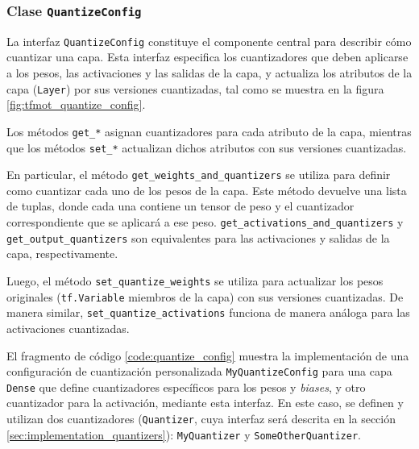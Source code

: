 
\subsubsection{Clase \texttt{QuantizeConfig}}
\label{sec:quantize_config}
La interfaz \texttt{QuantizeConfig} \cite{tensorflow_quantize_config} constituye el componente central para describir cómo cuantizar una capa. Esta interfaz especifica los cuantizadores que deben aplicarse a los pesos, las activaciones y las salidas de la capa, y actualiza los atributos de la capa (\texttt{Layer}) por sus versiones cuantizadas, tal como se muestra en la figura \ref{fig:tfmot_quantize_config}.


Los métodos \texttt{get\_*} asignan cuantizadores para cada atributo de la capa, mientras que los métodos \texttt{set\_*} actualizan dichos atributos con sus versiones cuantizadas.

En particular, el método \texttt{get\_weights\_and\_quantizers} se utiliza para definir como cuantizar cada uno de los pesos de la capa. Este método devuelve una lista de tuplas, donde cada una contiene un tensor de peso y el cuantizador correspondiente que se aplicará a ese peso. \texttt{get\_activations\_and\_quantizers} y \texttt{get\_output\_quantizers} son equivalentes para las activaciones y salidas de la capa, respectivamente.

Luego, el método \texttt{set\_quantize\_weights} se utiliza para actualizar los pesos originales (\texttt{tf.Variable} miembros de la capa) con sus versiones cuantizadas. De manera similar, \texttt{set\_quantize\_activations} funciona de manera análoga para las activaciones cuantizadas.

El fragmento de código \ref{code:quantize_config} muestra la implementación de una configuración de cuantización personalizada \texttt{MyQuantizeConfig} para una capa \texttt{Dense} que define cuantizadores específicos para los pesos y \textit{biases}, y otro cuantizador para la activación,  mediante esta interfaz. En este caso, se definen y utilizan dos cuantizadores (\texttt{Quantizer}, cuya interfaz será descrita en la sección \ref{sec:implementation_quantizers}): \texttt{MyQuantizer} y \texttt{SomeOtherQuantizer}.

